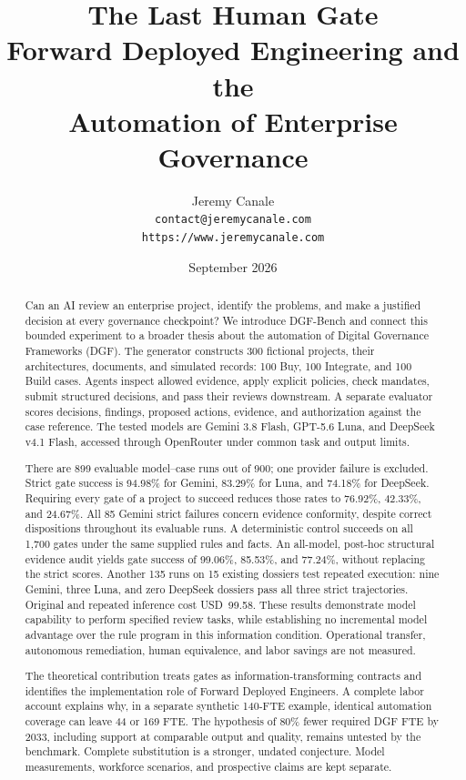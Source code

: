 \documentclass[11pt,a4paper]{article}
\title{\textbf{The Last Human Gate}\\[0.35em]
       \large Forward Deployed Engineering and the\\
       Automation of Enterprise Governance}
\author{\large Jeremy Canale\\[0.2em]
        \normalsize\texttt{contact@jeremycanale.com}\\
        \normalsize\texttt{https://www.jeremycanale.com}}
\date{September 2026}
\theoremstyle{definition}
\begin{document}
\maketitle

\begin{abstract}
\noindent Can an AI review an enterprise project, identify the problems, and make a justified
decision at every governance checkpoint? We introduce DGF-Bench and connect this bounded experiment
to a broader thesis about the automation of Digital Governance Frameworks (DGF). The generator
constructs 300 fictional projects, their architectures, documents, and simulated records: 100 Buy,
100 Integrate, and 100 Build cases. Agents inspect allowed evidence, apply explicit policies,
check mandates, submit structured decisions, and pass their reviews downstream. A separate
evaluator scores decisions, findings, proposed actions, evidence, and authorization against the
case reference. The tested models are Gemini 3.8 Flash, GPT-5.6 Luna, and DeepSeek v4.1 Flash,
accessed through OpenRouter under common task and output limits.

There are 899 evaluable model--case runs out of 900; one provider failure is excluded. Strict
gate success is 94.98\% for Gemini, 83.29\% for Luna, and 74.18\% for DeepSeek. Requiring every
gate of a project to succeed reduces those rates to 76.92\%, 42.33\%, and 24.67\%. All 85
Gemini strict failures concern evidence conformity, despite correct dispositions throughout its
evaluable runs. A deterministic control succeeds on all 1,700 gates under the same supplied
rules and facts. An all-model, post-hoc structural evidence audit yields gate success of
99.06\%, 85.53\%, and 77.24\%, without replacing the strict scores. Another 135 runs on
15 existing dossiers test repeated execution: nine Gemini, three Luna, and zero DeepSeek
dossiers pass all three strict trajectories. Original and repeated inference cost USD~99.58.
These results demonstrate model capability to perform specified review tasks, while establishing
no incremental model advantage over the rule program in this information condition. Operational
transfer, autonomous remediation, human equivalence, and labor savings are not measured.

The theoretical contribution treats gates as information-transforming contracts and identifies
the implementation role of Forward Deployed Engineers. A complete labor account explains why,
in a separate synthetic 140-FTE example, identical automation coverage can leave 44 or 169 FTE.
The hypothesis of 80\% fewer required DGF FTE by 2033, including support at comparable output
and quality, remains untested by the benchmark. Complete substitution is a stronger, undated
conjecture. Model measurements, workforce scenarios, and prospective claims are kept separate.
\end{abstract}
\end{document}
